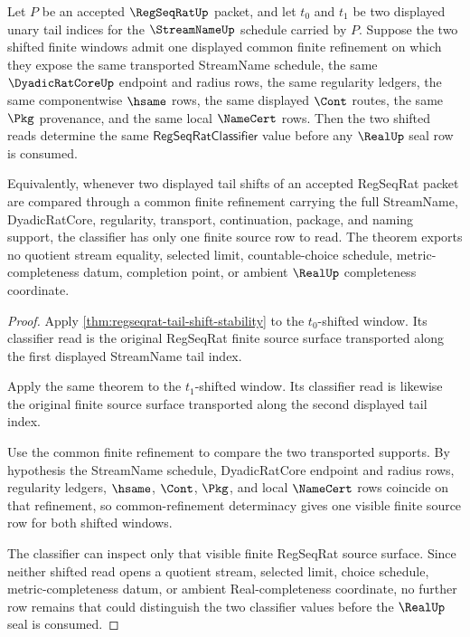 \begin{theorem}
\label{thm:regseqrat-tail-shift-common-refinement}
Let $P$ be an accepted $\RegSeqRatUp$ packet, and let $t_0$ and $t_1$ be two displayed unary tail indices for the $\StreamNameUp$ schedule carried by $P$. Suppose the two shifted finite windows admit one displayed common finite refinement on which they expose the same transported StreamName schedule, the same $\DyadicRatCoreUp$ endpoint and radius rows, the same regularity ledgers, the same componentwise $\hsame$ rows, the same displayed $\Cont$ routes, the same $\Pkg$ provenance, and the same local $\NameCert$ rows. Then the two shifted reads determine the same $\mathsf{RegSeqRatClassifier}$ value before any $\RealUp$ seal row is consumed.

Equivalently, whenever two displayed tail shifts of an accepted RegSeqRat packet are compared through a common finite refinement carrying the full StreamName, DyadicRatCore, regularity, transport, continuation, package, and naming support, the classifier has only one finite source row to read. The theorem exports no quotient stream equality, selected limit, countable-choice schedule, metric-completeness datum, completion point, or ambient $\RealUp$ completeness coordinate.
\end{theorem}
\begin{proof}
Apply \autoref{thm:regseqrat-tail-shift-stability} to the $t_0$-shifted window. Its classifier read is the original RegSeqRat finite source surface transported along the first displayed StreamName tail index.

Apply the same theorem to the $t_1$-shifted window. Its classifier read is likewise the original finite source surface transported along the second displayed tail index.

Use the common finite refinement to compare the two transported supports. By hypothesis the StreamName schedule, DyadicRatCore endpoint and radius rows, regularity ledgers, $\hsame$, $\Cont$, $\Pkg$, and local $\NameCert$ rows coincide on that refinement, so common-refinement determinacy gives one visible finite source row for both shifted windows.

The classifier can inspect only that visible finite RegSeqRat source surface. Since neither shifted read opens a quotient stream, selected limit, choice schedule, metric-completeness datum, or ambient Real-completeness coordinate, no further row remains that could distinguish the two classifier values before the $\RealUp$ seal is consumed.
\end{proof}

